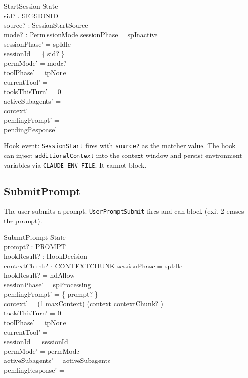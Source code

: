 \documentclass[a4paper,10pt,fleqn]{article}
\begin{document}
\begin{schema}{StartSession}
  \Delta State \\
  sid? : SESSIONID \\
  source? : SessionStartSource \\
  mode? : PermissionMode
  \where
  sessionPhase = spInactive \\
  sessionPhase' = spIdle \\
  sessionId' = \{ sid? \} \\
  permMode' = mode? \\
  toolPhase' = tpNone \\
  currentTool' = \emptyset \\
  toolsThisTurn' = 0 \\
  activeSubagents' = \emptyset \\
  context' = \langle \rangle \\
  pendingPrompt' = \emptyset \\
  pendingResponse' = \emptyset
\end{schema}

Hook event: \texttt{SessionStart} fires with \texttt{source?} as the
matcher value. The hook can inject \texttt{additionalContext} into the
context window and persist environment variables via
\texttt{CLAUDE\_ENV\_FILE}. It cannot block.

\subsection{SubmitPrompt}

The user submits a prompt. \texttt{UserPromptSubmit} fires and can
block (exit 2 erases the prompt).

\begin{schema}{SubmitPrompt}
  \Delta State \\
  prompt? : PROMPT \\
  hookResult? : HookDecision \\
  contextChunk? : CONTEXTCHUNK
  \where
  sessionPhase = spIdle \\
  hookResult? = hdAllow \\
  sessionPhase' = spProcessing \\
  pendingPrompt' = \{ prompt? \} \\
  context' = (1 \upto maxContext) \dres (context \cat \langle contextChunk? \rangle) \\
  toolsThisTurn' = 0 \\
  toolPhase' = tpNone \\
  currentTool' = \emptyset \\
  sessionId' = sessionId \\
  permMode' = permMode \\
  activeSubagents' = activeSubagents \\
  pendingResponse' = \emptyset
\end{schema}
\end{document}
